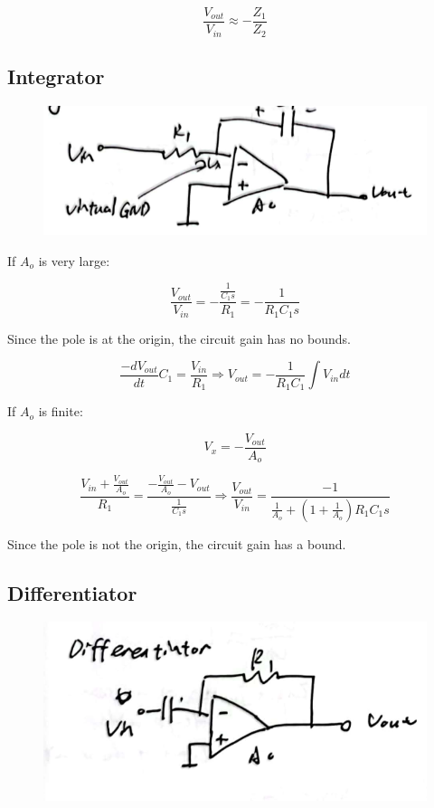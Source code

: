 \documentclass[fontset=windows]{article}
\begin{document}
$$\frac{V_{out}}{V_{in}}\approx -\frac{Z_1}{Z_2}$$

\subsection*{Integrator}

\begin{figure}[htbp]
    \centering
    \includegraphics[scale=0.8]{15.jpg}
    \captionsetup{labelformat=empty}
    \caption{}
    \label{15}
\end{figure}

If $A_o$ is very large: 

$$\frac{V_{out}}{V_{in}}=-\frac{\frac{1}{C_1s}}{R_1}=-\frac{1}{R_1C_1s}$$

Since the pole is at the origin, the circuit gain has no bounds. 

$$\frac{-dV_{out}}{dt}C_1=\frac{V_{in}}{R_1}\Longrightarrow V_{out}=-\frac{1}{R_1C_1}\int V_{in}dt$$

If $A_o$ is finite: 

$$V_x=-\frac{V_{out}}{A_o}$$

$$\frac{V_{in}+\frac{V_{out}}{A_o}}{R_1}=\frac{-\frac{V_{out}}{A_o}-V_{out}}{\frac{1}{C_1s}}\Longrightarrow \frac{V_{out}}{V_{in}}=\frac{-1}{\frac{1}{A_o}+(1+\frac{1}{A_o})R_1C_1s}$$

Since the pole is not the origin, the circuit gain has a bound. 

\subsection*{Differentiator}

\begin{figure}[htbp]
    \centering
    \includegraphics[scale=0.8]{16.jpg}
    \captionsetup{labelformat=empty}
    \caption{}
    \label{16}
\end{figure}
\end{document}
